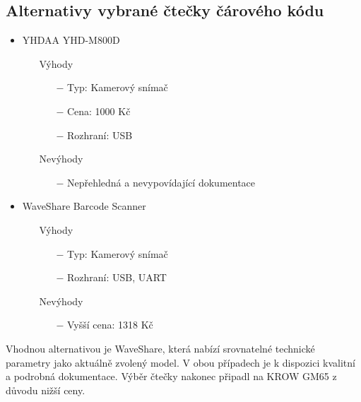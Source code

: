 



\subsection{Alternativy vybrané čtečky čárového kódu}

\begin{itemize}
    \item YHDAA YHD-M800D
    \begin{itemize}
        \item[] Výhody
        \begin{itemize}
            \item[$-$] Typ: Kamerový snímač
            \item[$-$] Cena: 1000 Kč
            \item[$-$] Rozhraní: USB
        \end{itemize}
        \item[] Nevýhody
        \begin{itemize}
            \item[$-$] Nepřehledná a nevypovídající dokumentace
        \end{itemize}
    \end{itemize}
    \item WaveShare Barcode Scanner
    \begin{itemize}
        \item[] Výhody
        \begin{itemize}
            \item[$-$] Typ: Kamerový snímač
            \item[$-$] Rozhraní: USB, UART
        \end{itemize}
        \item[] Nevýhody
            \begin{itemize}
                \item[$-$] Vyšší cena: 1318 Kč
            \end{itemize}
    \end{itemize}
\end{itemize}
\smallskip
Vhodnou alternativou je WaveShare, která nabízí srovnatelné technické parametry jako aktuálně zvolený model. V obou případech je k dispozici kvalitní a podrobná dokumentace. Výběr čtečky nakonec připadl na KROW GM65 z důvodu nižší ceny.



